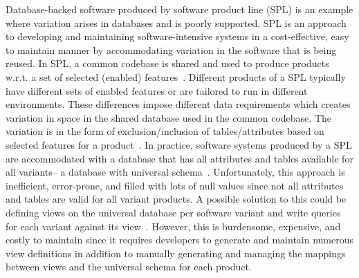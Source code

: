 Database-backed software produced by software product line (SPL) 
is an example where variation arises in databases and is poorly 
supported. SPL is an
approach to developing and maintaining software-intensive systems 
in a cost-effective, easy to maintain manner by accommodating variation
in the software that is being reused. 
In SPL, a common codebase is shared and used to produce products w.r.t.
a set of selected (enabled) features~\cite{splBook}. 
Different products of a SPL typically have different
sets of enabled features or are tailored to run in different environments. These
differences impose different data requirements which creates variation in space 
in the shared database used in the common codebase. 
%
%
The variation is in the form of exclusion/inclusion of tables/attributes based on
selected features for a product~\cite{vdbSpl18ATW}.
%
In practice, software systems produced by a SPL are accommodated with a database that
has all attributes and tables available for all variants-- a database with universal schema~\cite{vdbSpl18ATW}. 
Unfortunately, this approach is
inefficient, error-prone, and filled with lots of null values since not all attributes and tables
are valid for all variant products. A possible solution to this could be defining views on 
the universal database per software variant and write queries for each variant against its 
view~\cite{vdbSpl18ATW}.
However, this is burdensome, expensive, and costly to maintain since it 
requires developers to generate and maintain numerous view definitions
in addition to manually generating
and managing the mappings between views and the universal schema for each product.


